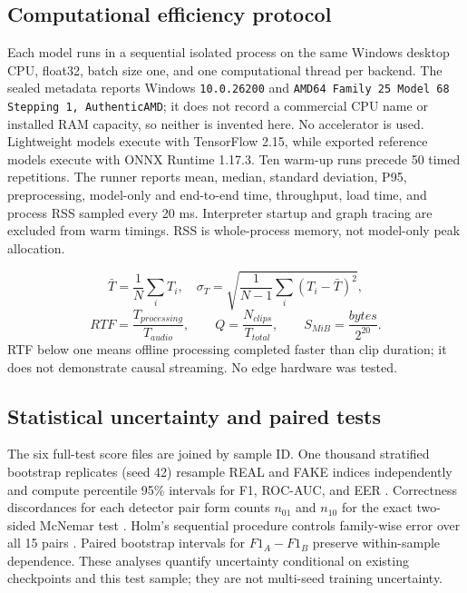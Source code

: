 \documentclass[10pt,journal,onecolumn]{IEEEtran}
\begin{document}
\subsection{Computational efficiency protocol}
Each model runs in a sequential isolated process on the same Windows desktop CPU, float32, batch size one, and one computational thread per backend. The sealed metadata reports Windows \texttt{10.0.26200} and \texttt{AMD64 Family 25 Model 68 Stepping 1, AuthenticAMD}; it does not record a commercial CPU name or installed RAM capacity, so neither is invented here. No accelerator is used. Lightweight models execute with TensorFlow 2.15, while exported reference models execute with ONNX Runtime 1.17.3. Ten warm-up runs precede 50 timed repetitions. The runner reports mean, median, standard deviation, P95, preprocessing, model-only and end-to-end time, throughput, load time, and process RSS sampled every 20 ms. Interpreter startup and graph tracing are excluded from warm timings. RSS is whole-process memory, not model-only peak allocation.

\begin{equation}
\bar T=\frac{1}{N}\sum_iT_i,\quad \sigma_T=\sqrt{\frac{1}{N-1}\sum_i(T_i-\bar T)^2},
\end{equation}
\begin{equation}
RTF=\frac{T_{processing}}{T_{audio}},\qquad Q=\frac{N_{clips}}{T_{total}},\qquad S_{MiB}=\frac{bytes}{2^{20}}.
\end{equation}
RTF below one means offline processing completed faster than clip duration; it does not demonstrate causal streaming. No edge hardware was tested.

\subsection{Statistical uncertainty and paired tests}
The six full-test score files are joined by sample ID. One thousand stratified bootstrap replicates (seed 42) resample REAL and FAKE indices independently and compute percentile 95\% intervals for F1, ROC-AUC, and EER \cite{efron1979bootstrap}. Correctness discordances for each detector pair form counts $n_{01}$ and $n_{10}$ for the exact two-sided McNemar test \cite{mcnemar1947}. Holm's sequential procedure controls family-wise error over all 15 pairs \cite{holm1979}. Paired bootstrap intervals for $F1_A-F1_B$ preserve within-sample dependence. These analyses quantify uncertainty conditional on existing checkpoints and this test sample; they are not multi-seed training uncertainty.
\end{document}
